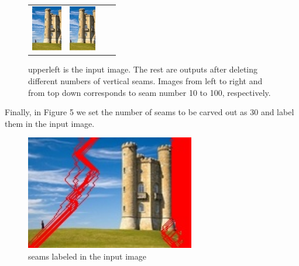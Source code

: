 \documentclass{article}
\begin{document}
\begin{figure}[htbp]
\begin{tabular}{llll}
	\includegraphics[height=2cm]{image_output_90.jpg} &
	\includegraphics[height=2cm]{image_output_100.jpg}
	\end{tabular}
	\centering
	\caption{upperleft is the input image. The rest are outputs after deleting different numbers of vertical seams. Images from left to right and from top down corresponds to seam number 10 to 100, respectively.}
	\end{figure}

	Finally, in Figure 5 we set the number of seams to be carved out as 30 and label them in the input image.

	\begin{figure}[htbp]
	\centering
	\includegraphics[height=5cm]{seams_30.jpg}
	\caption{seams labeled in the input image}
	\end{figure}


 
\end{document}
